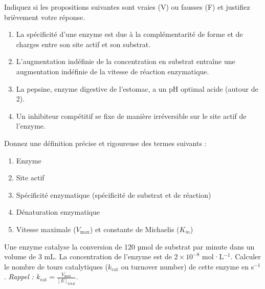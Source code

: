 \documentclass[11pt]{article}
\newcounter{popsec}
\newcounter{popsub}
\newcommand{\courssub}[1]{%
  \stepcounter{popsub}%
  \par\vspace{9pt}\noindent{\popxbold\fontsize{11.5}{13}\selectfont\color{popink}{\color{poporange}\thepopsec.\thepopsub}\hspace{6pt}#1}\par\nopagebreak\vspace{4pt}
}
\begin{document}
\begin{exercice}
Indiquez si les propositions suivantes sont vraies (V) ou fausses (F) et justifiez brièvement votre réponse.
\begin{enumerate}
    \item La spécificité d'une enzyme est due à la complémentarité de forme et de charges entre son site actif et son substrat.
    \item L'augmentation indéfinie de la concentration en substrat entraîne une augmentation indéfinie de la vitesse de réaction enzymatique.
    \item La pepsine, enzyme digestive de l'estomac, a un pH optimal acide (autour de 2).
    \item Un inhibiteur compétitif se fixe de manière irréversible sur le site actif de l'enzyme.
\end{enumerate}
\end{exercice}

\begin{exercice}
Donnez une définition précise et rigoureuse des termes suivants :
\begin{enumerate}
    \item Enzyme
    \item Site actif
    \item Spécificité enzymatique (spécificité de substrat et de réaction)
    \item Dénaturation enzymatique
    \item Vitesse maximale ($V_{\text{max}}$) et constante de Michaelis ($K_m$)
\end{enumerate}
\end{exercice}

\begin{exercice}
Une enzyme catalyse la conversion de 120 µmol de substrat par minute dans un volume de 3 mL. La concentration de l'enzyme est de $2 \times 10^{-8}$ mol·L$^{-1}$.
Calculer le nombre de tours catalytiques ($k_{\text{cat}}$ ou turnover number) de cette enzyme en s$^{-1}$.
\emph{Rappel : $k_{\text{cat}} = \frac{V_{\text{max}}}{[E]_{\text{total}}}$.}
\end{exercice}

\courssub{Je m'entraîne}
\end{document}

